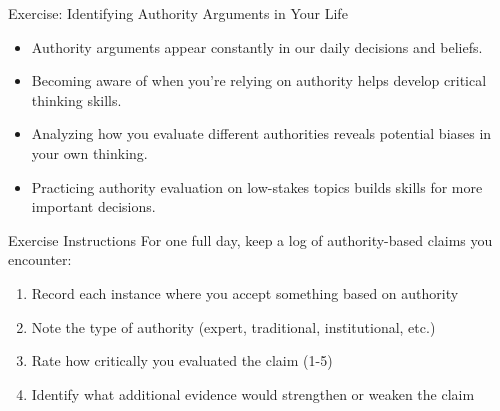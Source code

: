 \documentclass{beamer}
\begin{document}
\begin{frame}{Exercise: Identifying Authority Arguments in Your Life}
    \begin{itemize}
        \item Authority arguments appear constantly in our daily decisions and beliefs.
        \item Becoming aware of when you're relying on authority helps develop critical thinking skills.
        \item Analyzing how you evaluate different authorities reveals potential biases in your own thinking.
        \item Practicing authority evaluation on low-stakes topics builds skills for more important decisions.
    \end{itemize}
    
    \begin{block}{Exercise Instructions}
        \scriptsize
        For one full day, keep a log of authority-based claims you encounter:
        \begin{enumerate}
            \item Record each instance where you accept something based on authority
            \item Note the type of authority (expert, traditional, institutional, etc.)
            \item Rate how critically you evaluated the claim (1-5)
            \item Identify what additional evidence would strengthen or weaken the claim
        \end{enumerate}
    \end{block}
\end{frame}
\end{document}
